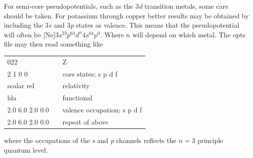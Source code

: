 \documentclass[11pt]{report}
\begin{document}
For semi-core pseudopotentials, such as the 3{\it d} transition metals, some care should be taken. 
For potassium through copper better results may be obtained by including the 3{\it s} and 3{\it p} states as valence. 
This means that the pseudopotential will often be [Ne]$3s^23p^63d^n4s^04p^0$. 
Where $n$ will depend on which metal. 
The opts file may then read something like 
\begin{center}
\begin{tabular}{| l | c l |}
\hline
022				& &  Z\\
2 1 0 0			& & core states; s p d f \\
scalar rel			& & relativity \\
lda				& & functional \\
2.0 6.0 2.0 0.0		& & valence occupation; s p d f \\
2.0 6.0 2.0 0.0		& & repeat of above \\
\hline
\end{tabular}
\end{center}
where the occupations of the {\it s} and {\it p} channels reflects the $n=3$ principle quantum level.




\end{document}
